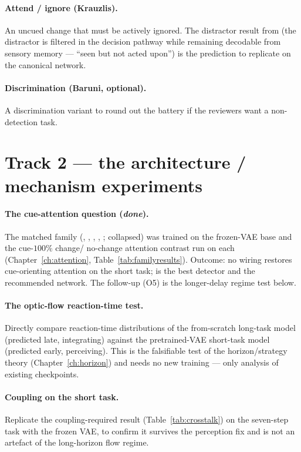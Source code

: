 \paragraph{Attend / ignore (Krauzlis).} An uncued change that must be actively ignored. The
distractor result from  (the distractor is filtered in the decision pathway
while remaining decodable from sensory memory --- ``seen but not acted upon'') is the
prediction to replicate on the canonical network.

\paragraph{Discrimination (Baruni, optional).} A discrimination variant to round out the
battery if the reviewers want a non-detection task.

\section{Track 2 --- the architecture / mechanism experiments}
\paragraph{The cue-attention question (\emph{done}).} The matched family
(, , , , ;
 collapsed) was trained on the frozen-VAE base and the cue-$100\%$ change/
no-change attention contrast run on each (Chapter~\ref{ch:attention},
Table~\ref{tab:familyresults}). Outcome: no wiring restores cue-orienting attention on the
short task;  is the best detector and the recommended network. The follow-up
(O5) is the longer-delay regime test below.

\paragraph{The optic-flow reaction-time test.} Directly compare reaction-time distributions
of the from-scratch long-task model (predicted late, integrating) against the pretrained-VAE
short-task model (predicted early, perceiving). This is the falsifiable test of the
horizon/strategy theory (Chapter~\ref{ch:horizon}) and needs no new training --- only
analysis of existing checkpoints.

\paragraph{Coupling on the short task.} Replicate the coupling-required result
(Table~\ref{tab:crosstalk}) on the seven-step task with the frozen VAE, to confirm it
survives the perception fix and is not an artefact of the long-horizon flow regime.

